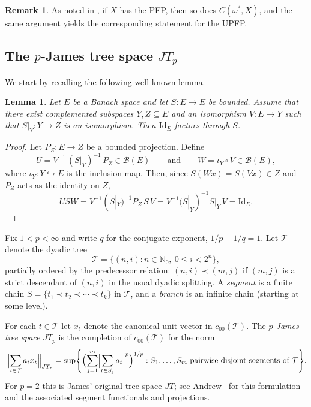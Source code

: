\documentclass[11pt]{amsart}
\theoremstyle{plain}
\newtheorem{lemma}[theorem]{Lemma}
\theoremstyle{definition}
\newtheorem{remark}[theorem]{Remark}
\numberwithin{equation}{section}
\newcommand{\Id}{\mathrm{Id}}
\renewcommand{\le}{\leqslant}
\begin{document}
\begin{remark}
    As noted in \cite{Drewnowski1989}, if $X$ has the PFP, then so does $C(\omega^*,X)$, and the same argument yields the corresponding statement for the UPFP.
\end{remark}



\subsection{\texorpdfstring{The $p$-James tree space $JT_p$}{The p-James tree space JT_p}}

We start by recalling the following well-known lemma.

\begin{lemma}\label{lem:bb-complemented-implies-factor}
Let $E$ be a Banach space and let $S\colon E\to E$ be bounded.
Assume that there exist complemented subspaces $Y, Z\subseteq E$ and an isomorphism
$V\colon E\to Y$ such that $S|_Y\colon Y\to Z$ is an isomorphism.
Then $\Id_E$ factors through $S$.
\end{lemma}

\begin{proof}
Let $P_Z\colon E\to Z$ be a bounded projection.
Define
\[
U = V^{-1}\,(S|_Y)^{-1}\,P_Z \in \mathscr B(E)
\qquad\text{and}\qquad
W = \iota_Y\circ V \in \mathscr B(E),
\]
where $\iota_Y\colon Y\hookrightarrow E$ is the inclusion map.
Then, since $S(Wx)=S(Vx)\in Z$ and $P_Z$ acts as the identity on $Z$,
\[
USW = V^{-1}(S|_Y)^{-1}P_Z\,S\,V
= V^{-1}(S|_Y)^{-1}S|_Y\,V
= \Id_E.
\]
\end{proof}

Fix $1 < p < \infty$ and write $q$ for the conjugate exponent, $1/p+1/q=1$. Let $\mathcal T$ denote the dyadic tree
\[
\mathcal T=\{(n,i): n\in\mathbb N_0,\ 0\le i<2^n\},
\]
partially ordered by the predecessor relation: $(n,i)\prec (m,j)$ if $(m,j)$
is a strict descendant of $(n,i)$ in the usual dyadic splitting.
A \emph{segment} is a finite chain $S=\{t_1\prec t_2\prec\cdots\prec t_k\}$ in $\mathcal T$,
and a \emph{branch} is an infinite chain (starting at some level).

For each $t\in\mathcal T$ let $x_t$ denote the canonical unit vector in $c_{00}(\mathcal T)$.
The \emph{$p$-James tree space} $JT_p$ is the completion of $c_{00}(\mathcal T)$ for the norm
\begin{equation}\label{eq:JT_p_norm}
\Bigl\|\sum_{t\in\mathcal T} a_t x_t\Bigr\|_{JT_p}
=
\sup\Biggl\{
\Bigl(
\sum_{j=1}^m
\Bigl|\sum_{t\in S_j} a_t\Bigr|^p
\Bigr)^{1/p}
:
S_1,\dots,S_m \ \text{pairwise disjoint segments of }\mathcal T
\Biggr\}.
\end{equation}
For $p=2$ this is James' original tree space $JT$; see Andrew~\cite{Andrew1983} for this formulation
and the associated segment functionals and projections.
\end{document}
